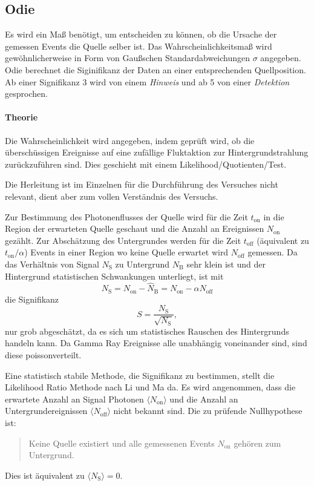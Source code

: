 \subsection{Odie}%
\label{sub:odie}
Es wird ein Maß benötigt, um entscheiden zu können,
ob die Ursache der gemessen Events die Quelle selber ist.
Das Wahrscheinlichkeitsmaß wird gewöhnlicherweise in Form von Gaußschen
Standardabweichungen $\sigma$ angegeben.
Odie berechnet die Siginifikanz der Daten an einer entsprechenden Quellposition. 
Ab einer Signifikanz \SI{3}{\sigma} wird von einem \textit{Hinweis} 
und ab \SI{5}{\sigma} von einer \textit{Detektion} gesprochen.

\paragraph{Theorie}%

Die Wahrscheinlichkeit wird angegeben, indem geprüft wird,
ob die über\-schüssigen Ereignisse auf eine zufällige
Fluktaktion zur Hintergrundstrahlung zurück\-zu\-führen sind.
Dies geschieht mit einem Likelihood\-/Quotienten\-/Test.

Die Herleitung ist im Einzelnen für die Durchführung des
Versuches nicht relevant,
dient aber zum vollen Verständnis des Versuchs.

Zur Bestimmung des Photonenflusses der Quelle wird für die Zeit $t_\text{on}$ in die Region der
erwarteten Quelle geschaut und die Anzahl an Ereignissen $N_\text{on}$ gezählt.
Zur Abschätzung des Untergrundes werden für die Zeit $t_\text{off}$
(äquivalent zu $t_\text{on} / \alpha$)
Events in einer Region wo keine Quelle erwartet wird $N_\text{off}$ gemessen.
Da das Verhältnis von Signal $N_\text{S}$ zu Untergrund
$N_\text{B}$ sehr klein ist
und der Hintergrund statistischen Schwankungen unterliegt,
ist mit
\begin{equation}
	N_\text{S} = N_\text{on} - \hat{N}_\text{B} = N_\text{on} - \alpha N_\text{off}
\end{equation}
die Signifikanz 
\begin{equation}
	S = \frac{N_\text{S}}{\sqrt{N_\text{S}}},
\end{equation}
nur grob abgeschätzt, da es sich um statistisches Rauschen des
Hintergrunds handeln kann.
Da Gamma Ray Ereignisse alle unabhängig voneinander sind,
sind diese poissonverteilt.

Eine statistisch stabile Methode, die Signifikanz zu bestimmen, stellt die
Likelihood Ratio Methode nach Li und Ma da.
Es wird angenommen, dass die erwartete Anzahl an Signal
Photonen $\langle N_\text{on} \rangle$ und die Anzahl an Untergrundereignissen 
$\langle N_\text{off} \rangle$ nicht bekannt sind.
Die zu prüfende Nullhypothese ist:
\begin{quote}
	Keine Quelle existiert und
    alle gemessenen Events $N_\text{on}$ gehören zum Untergrund.
\end{quote}
Dies ist äquivalent zu $\langle N_\text{S} \rangle=0$.

